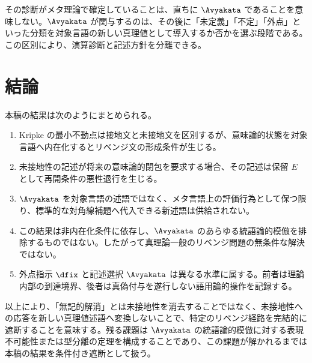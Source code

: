 \documentclass[11pt,a4paper]{article}
\theoremstyle{definition}
\theoremstyle{definition}
\newcommand{\Epoch}{E}
\begin{document}
その診断がメタ理論で確定していることは、直ちに $\Avyakata$ であることを意味しない。$\Avyakata$ が関与するのは、その後に「未定義」「不定」「外点」といった分類を対象言語の新しい真理値として導入するか否かを選ぶ段階である。この区別により、演算診断と記述方針を分離できる。

\section{結論}

本稿の結果は次のようにまとめられる。

\begin{enumerate}
 \item Kripke の最小不動点は接地文と未接地文を区別するが、意味論的状態を対象言語へ内在化するとリベンジ文の形成条件が生じる。
 \item 未接地性の記述が将来の意味論的閉包を要求する場合、その記述は保留 $\Epoch$ として再開条件の悪性退行を生じる。
 \item $\Avyakata$ を対象言語の述語ではなく、メタ言語上の評価行為として保つ限り、標準的な対角線補題へ代入できる新述語は供給されない。
 \item この結果は非内在化条件に依存し、$\Avyakata$ のあらゆる統語論的模倣を排除するものではない。したがって真理論一般のリベンジ問題の無条件な解決ではない。
 \item 外点指示 $\dfix$ と記述選択 $\Avyakata$ は異なる水準に属する。前者は理論内部の到達境界、後者は真偽付与を遂行しない語用論的操作を記録する。
\end{enumerate}

以上により、「無記的解消」とは未接地性を消去することではなく、未接地性への応答を新しい真理値述語へ変換しないことで、特定のリベンジ経路を完結的に遮断することを意味する。残る課題は $\Avyakata$ の統語論的模倣に対する表現不可能性または型分離の定理を構成することであり、この課題が解かれるまでは本稿の結果を条件付き遮断として扱う。



\end{document}
